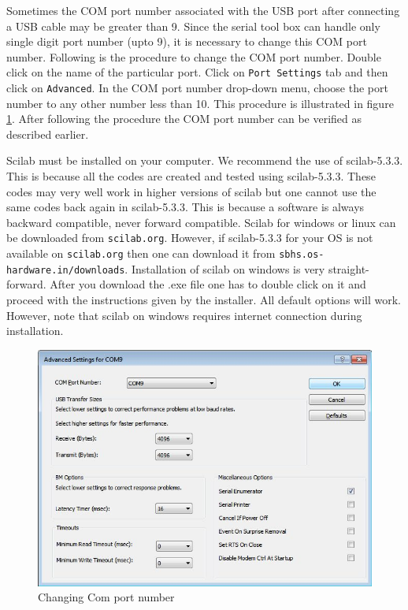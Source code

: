 Sometimes the COM port number associated with the USB port after connecting a USB cable may be greater than 9. Since the serial tool box can handle only single digit port number (upto 9), it is necessary to change this COM port number. Following is the procedure to change the COM port number.
Double click on the name of the particular port. Click on { \tt Port Settings} tab and then click on { \tt Advanced}. In the COM port number drop-down menu, choose the port number to any other number less than 10. This procedure is illustrated in figure \ref{com_change}. After following the procedure the COM port number can be verified as described earlier.

Scilab must be installed on your computer. We recommend the use of scilab-5.3.3. This is because all the codes are created and tested using scilab-5.3.3. These codes may very well work in higher versions of scilab but one cannot use the same codes back again in scilab-5.3.3. This is because a software is always backward compatible, never forward compatible. Scilab for windows or linux can be downloaded from {\tt scilab.org}. However, if scilab-5.3.3 for your OS is not available on {\tt scilab.org} then one can download it from {\tt sbhs.os-hardware.in/downloads}. Installation of scilab on windows is very straight-forward. After you download the .exe file one has to double click on it and proceed with the instructions given by the installer. All default options will work. However, note that scilab on windows requires internet connection during installation.
\begin{figure}
\centering
\includegraphics[width=0.7\linewidth]{using-sbhs/port2.jpg}
\caption{Changing Com port number}
\label{com_change}
\end{figure}
